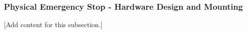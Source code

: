 
\subsubsection{Physical Emergency Stop - Hardware Design and Mounting}
\label{subsubsec:design_8_1_physical_estop}

[Add content for this subsection.]
